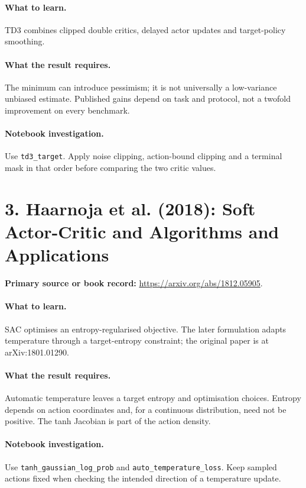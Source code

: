 \documentclass[11pt]{scrartcl}
\begin{document}
\paragraph{What to learn.} TD3 combines clipped double critics, delayed actor updates and target-policy smoothing.

\paragraph{What the result requires.} The minimum can introduce pessimism; it is not universally a low-variance unbiased estimate. Published gains depend on task and protocol, not a twofold improvement on every benchmark.

\paragraph{Notebook investigation.} Use \texttt{td3\_target}. Apply noise clipping, action-bound clipping and a terminal mask in that order before comparing the two critic values.

\section*{3. Haarnoja et al. (2018): Soft Actor-Critic and Algorithms and Applications}
\textbf{Primary source or book record:} \url{https://arxiv.org/abs/1812.05905}.

\paragraph{What to learn.} SAC optimises an entropy-regularised objective. The later formulation adapts temperature through a target-entropy constraint; the original paper is at arXiv:1801.01290.

\paragraph{What the result requires.} Automatic temperature leaves a target entropy and optimisation choices. Entropy depends on action coordinates and, for a continuous distribution, need not be positive. The tanh Jacobian is part of the action density.

\paragraph{Notebook investigation.} Use \texttt{tanh\_gaussian\_log\_prob} and \texttt{auto\_temperature\_loss}. Keep sampled actions fixed when checking the intended direction of a temperature update.
\end{document}

